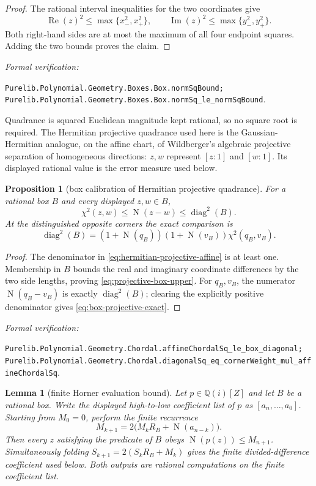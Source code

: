 \documentclass[11pt]{article}
\newtheorem{lemma}[theorem]{Lemma}
\newtheorem{proposition}[theorem]{Proposition}
\newcommand{\Qi}{\mathbb{Q}(i)}
\newcommand{\Norm}[1]{\operatorname{N}\!\left(#1\right)}
\newcommand{\Ree}{\operatorname{Re}}
\newcommand{\Imm}{\operatorname{Im}}
\newcommand{\diamq}{\operatorname{diag}^{2}}
\newcommand{\leanref}[1]{\par\smallskip\noindent
  \emph{Formal verification:}\par\nobreak
  {\raggedright\nolinkurl{#1}.\par}}
\begin{document}
\begin{proof}
The rational interval inequalities for the two coordinates give
\[
 \Ree(z)^2\le\max\{x_-^2,x_+^2\},\qquad
 \Imm(z)^2\le\max\{y_-^2,y_+^2\}.
\]
Both right-hand sides are at most the maximum of all four endpoint squares.
Adding the two bounds proves the claim.
\end{proof}

\leanref{Purelib.Polynomial.Geometry.Boxes.Box.normSqBound;
Purelib.Polynomial.Geometry.Boxes.Box.normSq_le_normSqBound}

Quadrance is squared Euclidean magnitude kept rational, so no square root is
required.  The Hermitian projective quadrance used here is the
Gaussian-Hermitian analogue, on the affine chart, of Wildberger's algebraic
projective separation of homogeneous directions: $z,w$ represent $[z:1]$
and $[w:1]$.  Its displayed rational value is the error measure used below.

\begin{proposition}[box calibration of Hermitian projective quadrance]
\label{prop:box-projective-calibration}
For a rational box $B$ and every displayed $z,w\in B$,
\begin{equation}
\label{eq:projective-box-upper}
       \chi^2(z,w)\le\Norm{z-w}\le\diamq(B).
\end{equation}
At the distinguished opposite corners the exact comparison is
\begin{equation}
\label{eq:box-projective-exact}
 \diamq(B)=
 (1+\Norm{q_B})(1+\Norm{v_B})\chi^2(q_B,v_B).
\end{equation}
\end{proposition}

\begin{proof}
The denominator in \cref{eq:hermitian-projective-affine} is at least one.
Membership in $B$ bounds the real and imaginary coordinate differences by the two side
lengths, proving \cref{eq:projective-box-upper}.  For $q_B,v_B$, the numerator
$\Norm{q_B-v_B}$ is exactly $\diamq(B)$; clearing the explicitly positive
denominator gives \cref{eq:box-projective-exact}.
\end{proof}

\leanref{Purelib.Polynomial.Geometry.Chordal.affineChordalSq_le_box_diagonal;
Purelib.Polynomial.Geometry.Chordal.diagonalSq_eq_cornerWeight_mul_affineChordalSq}

\begin{lemma}[finite Horner evaluation bound]
\label{lem:eval-bound}
Let $p\in\Qi[Z]$ and let $B$ be a rational box.  Write the displayed
high-to-low coefficient list of $p$ as
$[a_n,\ldots,a_0]$.  Starting from $M_0=0$, perform the finite recurrence
\[
        M_{k+1}=2\bigl(M_kR_B+\Norm{a_{n-k}}\bigr).
\]
Then every $z$ satisfying the predicate of $B$ obeys
$\Norm{p(z)}\le M_{n+1}$.  Simultaneously folding
$S_{k+1}=2(S_kR_B+M_k)$ gives the finite divided-difference coefficient used
below.  Both outputs are rational computations on the finite coefficient
list.
\end{lemma}
\end{document}
